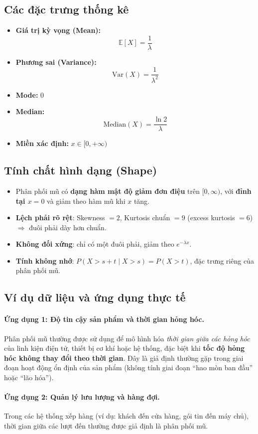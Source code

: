 \subsection{Các đặc trưng thống kê}

\begin{itemize}
    \item \textbf{Giá trị kỳ vọng (Mean):}
    \[
    \mathbb{E}[X] = \frac{1}{\lambda}
    \]
    \item \textbf{Phương sai (Variance):}
    \[
    \mathrm{Var}(X) = \frac{1}{\lambda^2}
    \]
    \item \textbf{Mode:} $0$
    \item \textbf{Median:}
    \[
    \mathrm{Median}(X) = \frac{\ln 2}{\lambda}
    \]
    \item \textbf{Miền xác định:} $x \in [0, +\infty)$
\end{itemize}

\subsection{Tính chất hình dạng (Shape)}

\begin{itemize}
    \item Phân phối mũ có \textbf{dạng hàm mật độ giảm đơn điệu} trên $[0,\infty)$, với \textbf{đỉnh tại $x=0$} và giảm theo hàm mũ khi $x$ tăng.
    \item \textbf{Lệch phải rõ rệt}: Skewness $= 2$, Kurtosis chuẩn $= 9$ (excess kurtosis $= 6$) $\Rightarrow$ đuôi phải dày hơn chuẩn.
    \item \textbf{Không đối xứng}: chỉ có một đuôi phải, giảm theo $e^{-\lambda x}$.
    \item \textbf{Tính không nhớ}: $P(X > s + t \mid X > s) = P(X > t)$, đặc trưng riêng của phân phối mũ.
\end{itemize}

\subsection{Ví dụ dữ liệu và ứng dụng thực tế}

\paragraph{Ứng dụng 1: Độ tin cậy sản phẩm và thời gian hỏng hóc.}  
Phân phối mũ thường được sử dụng để mô hình hóa \textit{thời gian giữa các hỏng hóc} 
của linh kiện điện tử, thiết bị cơ khí hoặc hệ thống, 
đặc biệt khi \textbf{tốc độ hỏng hóc không thay đổi theo thời gian}. 
Đây là giả định thường gặp trong giai đoạn hoạt động ổn định của sản phẩm 
(không tính giai đoạn “hao mòn ban đầu” hoặc “lão hóa”).

\paragraph{Ứng dụng 2: Quản lý lưu lượng và hàng đợi.}  
Trong các hệ thống xếp hàng (ví dụ: khách đến cửa hàng, gói tin đến máy chủ), 
thời gian giữa các lượt đến thường được giả định là phân phối mũ.
